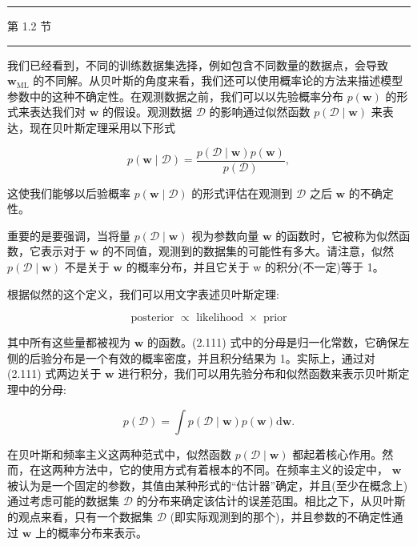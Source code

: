 \documentclass[10pt]{article}
\newcommand{\HRule}{\begin{center}\rule{0.9\linewidth}{0.2mm}\end{center}}
\begin{document}
\HRule

第 1.2 节

\HRule

我们已经看到，不同的训练数据集选择，例如包含不同数量的数据点，会导致 \({\mathbf{w}}_{\mathrm{{ML}}}\) 的不同解。从贝叶斯的角度来看，我们还可以使用概率论的方法来描述模型参数中的这种不确定性。在观测数据之前，我们可以以先验概率分布 \(p\left( \mathbf{w}\right)\) 的形式来表达我们对 \(\mathbf{w}\) 的假设。观测数据 \(\mathcal{D}\) 的影响通过似然函数 \(p\left( {\mathcal{D} \mid  \mathbf{w}}\right)\) 来表达，现在贝叶斯定理采用以下形式

\[
p\left( {\mathbf{w} \mid  \mathcal{D}}\right)  = \frac{p\left( {\mathcal{D} \mid  \mathbf{w}}\right) p\left( \mathbf{w}\right) }{p\left( \mathcal{D}\right) }, \tag{2.111}
\]

这使我们能够以后验概率 \(p\left( {\mathbf{w} \mid  \mathcal{D}}\right)\) 的形式评估在观测到 \(\mathcal{D}\) 之后 \(\mathbf{w}\) 的不确定性。

重要的是要强调，当将量 \(p\left( {\mathcal{D} \mid  \mathbf{w}}\right)\) 视为参数向量 \(\mathbf{w}\) 的函数时，它被称为似然函数，它表示对于 \(\mathbf{w}\) 的不同值，观测到的数据集的可能性有多大。请注意，似然 \(p\left( {\mathcal{D} \mid  \mathbf{w}}\right)\) 不是关于 \(\mathbf{w}\) 的概率分布，并且它关于 w 的积分(不一定)等于 1。

根据似然的这个定义，我们可以用文字表述贝叶斯定理:

\[
\text{ posterior } \propto  \text{ likelihood } \times  \text{ prior } \tag{2.112}
\]

其中所有这些量都被视为 \(\mathbf{w}\) 的函数。(2.111) 式中的分母是归一化常数，它确保左侧的后验分布是一个有效的概率密度，并且积分结果为 1。实际上，通过对 (2.111) 式两边关于 \(\mathbf{w}\) 进行积分，我们可以用先验分布和似然函数来表示贝叶斯定理中的分母:

\[
p\left( \mathcal{D}\right)  = \int p\left( {\mathcal{D} \mid  \mathbf{w}}\right) p\left( \mathbf{w}\right) \mathrm{d}\mathbf{w}. \tag{2.113}
\]

在贝叶斯和频率主义这两种范式中，似然函数 \(p\left( {\mathcal{D} \mid  \mathbf{w}}\right)\) 都起着核心作用。然而，在这两种方法中，它的使用方式有着根本的不同。在频率主义的设定中， \(\mathbf{w}\) 被认为是一个固定的参数，其值由某种形式的“估计器”确定，并且(至少在概念上)通过考虑可能的数据集 \(\mathcal{D}\) 的分布来确定该估计的误差范围。相比之下，从贝叶斯的观点来看，只有一个数据集 \(\mathcal{D}\) (即实际观测到的那个)，并且参数的不确定性通过 \(\mathbf{w}\) 上的概率分布来表示。
\end{document}
